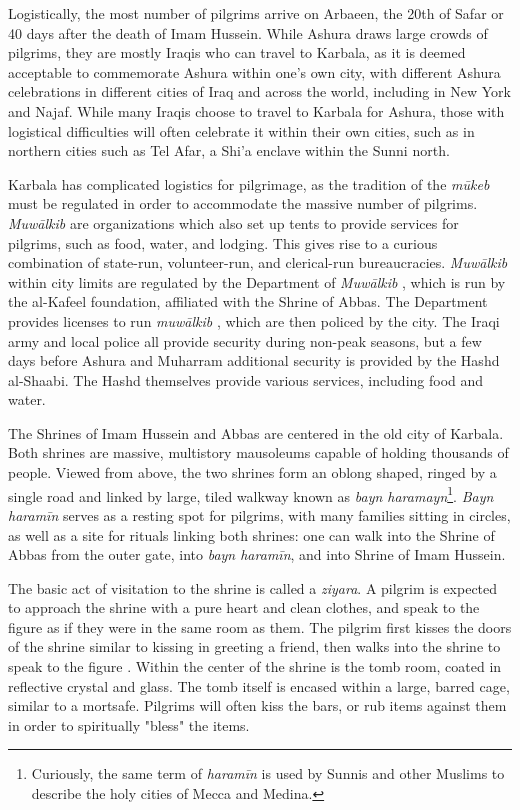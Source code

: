Logistically, the most number of pilgrims arrive on Arbaeen, the 20th of Safar or 40 days after the death of Imam Hussein. While Ashura draws large crowds of pilgrims, they are mostly Iraqis who can travel to Karbala, as it is deemed acceptable to commemorate Ashura within one’s own city, with different Ashura celebrations in different cities of Iraq and across the world, including in New York and Najaf. While many Iraqis choose to travel to Karbala for Ashura, those with logistical difficulties will often celebrate it within their own cities, such as in northern cities such as Tel Afar, a Shi'a enclave within the Sunni north.  

Karbala has complicated logistics for pilgrimage, as the tradition of the \emph{mūkeb} must be regulated in order to accommodate the massive number of pilgrims. \emph{Muwālkib}  are organizations which also set up tents to provide services for pilgrims, such as food, water, and lodging. This gives rise to a curious combination of state-run, volunteer-run, and clerical-run bureaucracies. \emph{Muwālkib}  within city limits are regulated by the Department of \emph{Muwālkib} , which is run by the al-Kafeel foundation, affiliated with the Shrine of Abbas. The Department provides licenses to run \emph{muwālkib} , which are then policed by the city. The Iraqi army and local police all provide security during non-peak seasons, but a few days before Ashura and Muharram additional security is provided by the Hashd al-Shaabi. The Hashd themselves provide various services, including food and water.

The Shrines of Imam Hussein and Abbas are centered in the old city of Karbala. Both shrines are massive, multistory mausoleums capable of holding thousands of people. Viewed from above, the two shrines form an oblong shaped, ringed by a single road and linked by large, tiled walkway known as \emph{bayn haramayn}\footnote{Curiously, the same term of \emph{haramīn} is used by Sunnis and other Muslims to describe the holy cities of Mecca and Medina.}. \emph{Bayn haramīn} serves as a resting spot for pilgrims, with many families sitting in circles, as well as a site for rituals linking both shrines: one can walk into the Shrine of Abbas from the outer gate, into \emph{bayn haramīn}, and into Shrine of Imam Hussein. 

The basic act of visitation to the shrine is called a \emph{ziyara}. A pilgrim is expected to approach the shrine with a pure heart and clean clothes, and speak to the figure as if they were in the same room as them. The pilgrim first kisses the doors of the shrine similar to kissing in greeting a friend, then walks into the shrine to speak to the figure \cite{qisa_publications_illustrated_2018}. Within the center of the shrine is the tomb room, coated in reflective crystal and glass. The tomb itself is encased within a large, barred cage, similar to a mortsafe. Pilgrims will often kiss the bars, or rub items against them in order to spiritually "bless" the items. 


